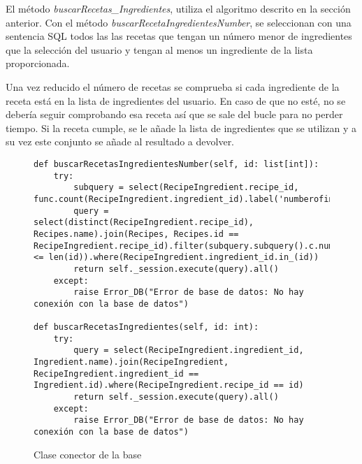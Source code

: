 El método \textit{buscarRecetas\_Ingredientes}, utiliza el algoritmo descrito en la sección anterior. Con el método \emph{buscarRecetaIngredientesNumber}, se seleccionan con una sentencia \gls{SQL} todos las las recetas que tengan un número menor de ingredientes que la selección del usuario y tengan al menos un ingrediente de la lista proporcionada. 

Una vez reducido el número de recetas se comprueba si cada ingrediente de la receta está en la lista de ingredientes del usuario. En caso de que no esté, no se debería seguir comprobando esa receta así que se sale del bucle para no perder tiempo. Si la receta cumple, se le añade la lista de ingredientes que se utilizan y a su vez este conjunto se añade al resultado a devolver.
\begin{figure}[H!]
\begin{lstlisting}[style=C, caption={Métodos de la base de datos utilizados para buscar recetas por ingredientes}]
    def buscarRecetasIngredientesNumber(self, id: list[int]):
    try:
        subquery = select(RecipeIngredient.recipe_id, func.count(RecipeIngredient.ingredient_id).label('numberofingredients')).group_by(RecipeIngredient.recipe_id)
        query = select(distinct(RecipeIngredient.recipe_id), Recipes.name).join(Recipes, Recipes.id == RecipeIngredient.recipe_id).filter(subquery.subquery().c.numberofingredients <= len(id)).where(RecipeIngredient.ingredient_id.in_(id))
        return self._session.execute(query).all()
    except:
        raise Error_DB("Error de base de datos: No hay conexión con la base de datos")
    
def buscarRecetasIngredientes(self, id: int):
    try:
        query = select(RecipeIngredient.ingredient_id, Ingredient.name).join(RecipeIngredient, RecipeIngredient.ingredient_id == Ingredient.id).where(RecipeIngredient.recipe_id == id)
        return self._session.execute(query).all()
    except:
        raise Error_DB("Error de base de datos: No hay conexión con la base de datos")
\end{lstlisting}
    \caption{Clase conector de la \gls{base}}
    \label{cmd:orm}
\end{figure}

